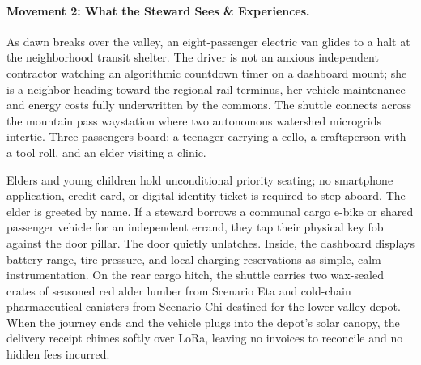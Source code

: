 \paragraph{Movement 2: What the Steward Sees \& Experiences.}
As dawn breaks over the valley, an eight-passenger electric van glides to a halt at the neighborhood transit shelter. The driver is not an anxious independent contractor watching an algorithmic countdown timer on a dashboard mount; she is a neighbor heading toward the regional rail terminus, her vehicle maintenance and energy costs fully underwritten by the commons. The shuttle connects across the mountain pass waystation where two autonomous watershed microgrids intertie. Three passengers board: a teenager carrying a cello, a craftsperson with a tool roll, and an elder visiting a clinic. 

Elders and young children hold unconditional priority seating; no smartphone application, credit card, or digital identity ticket is required to step aboard. The elder is greeted by name. If a steward borrows a communal cargo e-bike or shared passenger vehicle for an independent errand, they tap their physical key fob against the door pillar. The door quietly unlatches. Inside, the dashboard displays battery range, tire pressure, and local charging reservations as simple, calm instrumentation. On the rear cargo hitch, the shuttle carries two wax-sealed crates of seasoned red alder lumber from Scenario Eta and cold-chain pharmaceutical canisters from Scenario Chi destined for the lower valley depot. When the journey ends and the vehicle plugs into the depot's solar canopy, the delivery receipt chimes softly over LoRa, leaving no invoices to reconcile and no hidden fees incurred.

